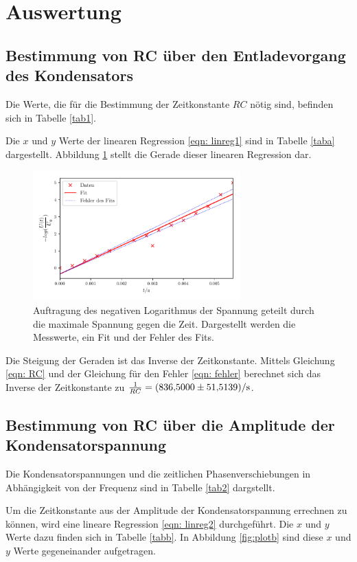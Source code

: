 \section{Auswertung}
\label{sec:Auswertung}


\subsection{Bestimmung von RC über den Entladevorgang des Kondensators}
\label{sec: a}
Die Werte, die für die Bestimmung der Zeitkonstante $RC$ nötig sind, befinden sich in Tabelle \ref{tab1}. %

Die $x$ und $y$ Werte der linearen Regression \eqref{eqn: linreg1} sind in Tabelle \ref{taba} dargestellt.
Abbildung \ref{fig:plota} stellt die Gerade dieser linearen Regression dar.

\begin{figure}
  \centering
  \includegraphics[width=8cm, height=5cm]{build/plota.pdf}
  \caption{Auftragung des negativen Logarithmus der Spannung geteilt durch die maximale Spannung gegen die Zeit.
  Dargestellt werden die Messwerte, ein Fit und der Fehler des Fits.} %
  \label{fig:plota}
\end{figure}

\noindent Die Steigung der Geraden ist das Inverse der Zeitkonstante.
Mittels Gleichung \eqref{eqn: RC} und der Gleichung für den Fehler \eqref{eqn: fehler} berechnet
sich das Inverse der Zeitkonstante zu $\frac{1}{RC} = \SI{836.500 \pm 51.5139}{\per\second}$.

\subsection{Bestimmung von RC über die Amplitude der Kondensatorspannung}
\label{sec: b}
Die Kondensatorspannungen und die zeitlichen Phasenverschiebungen in Abhängigkeit
von der Frequenz sind in Tabelle \ref{tab2} dargstellt.

Um die Zeitkonstante aus der Amplitude der Kondensatorspannung errechnen zu können, wird eine lineare Regression 
\eqref{eqn: linreg2} durchgeführt. Die $x$ und $y$ Werte dazu finden sich in Tabelle \ref{tabb}.
In Abbildung \ref{fig:plotb} sind diese $x$ und $y$ Werte gegeneinander aufgetragen.


